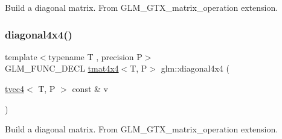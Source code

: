Build a diagonal matrix. From G\+L\+M\+\_\+\+G\+T\+X\+\_\+matrix\+\_\+operation extension. \mbox{\label{group__gtx__matrix__operation_gade576e044d8e52f343166f665589d782}} 
\subsubsection{\texorpdfstring{diagonal4x4()}{diagonal4x4()}}
{\footnotesize\ttfamily template$<$typename T , precision P$>$ \\
G\+L\+M\+\_\+\+F\+U\+N\+C\+\_\+\+D\+E\+CL \hyperlink{structglm_1_1tmat4x4}{tmat4x4}$<$T, P$>$ glm\+::diagonal4x4 (\begin{DoxyParamCaption}\item[{\hyperlink{structglm_1_1tvec4}{tvec4}$<$ T, P $>$ const \&}]{v }\end{DoxyParamCaption})}

Build a diagonal matrix. From G\+L\+M\+\_\+\+G\+T\+X\+\_\+matrix\+\_\+operation extension. 